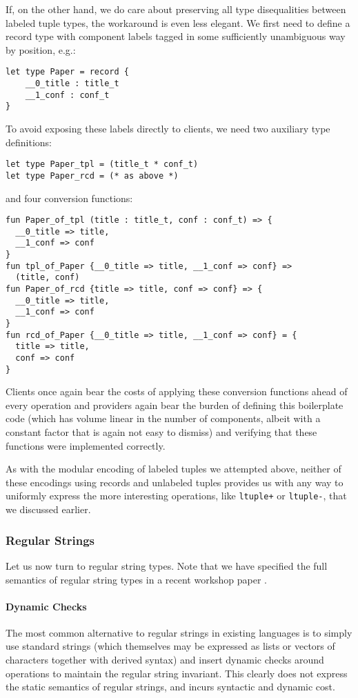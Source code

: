If, on the other hand, we do care about preserving all type disequalities between labeled tuple types, the workaround is even less elegant. We first need to define a record type with component labels tagged in some sufficiently unambiguous way by position, e.g.:
\begin{lstlisting}[numbers=none]
let type Paper = record {
	__0_title : title_t
	__1_conf : conf_t 
}\end{lstlisting}
To avoid exposing these labels directly to clients, we need two auxiliary type definitions:
\begin{lstlisting}[numbers=none]
let type Paper_tpl = (title_t * conf_t)
let type Paper_rcd = (* as above *)
\end{lstlisting}
and four conversion functions:
\begin{lstlisting}[numbers=none]
fun Paper_of_tpl (title : title_t, conf : conf_t) => {
  __0_title => title,
  __1_conf => conf
}
fun tpl_of_Paper {__0_title => title, __1_conf => conf} => 
  (title, conf)
fun Paper_of_rcd {title => title, conf => conf} => {
  __0_title => title,
  __1_conf => conf
}
fun rcd_of_Paper {__0_title => title, __1_conf => conf} = {
  title => title,
  conf => conf
}
\end{lstlisting}
Clients once again bear the costs of applying these conversion functions ahead of every operation and providers again bear the burden of defining this boilerplate code (which has volume linear in the number of components, albeit with a constant factor that is again not easy to dismiss) and verifying that these functions were implemented correctly. %

As with the modular encoding of labeled tuples we attempted above, neither of these encodings using records and unlabeled tuples provides us with any way to uniformly express the more interesting operations, like \lstinline{ltuple+} or \lstinline{ltuple-}, that we discussed earlier.

\subsubsection{Regular Strings}
Let us now turn to regular string types. Note that we have specified the full semantics of regular string types in a recent workshop paper \cite{sanitation-psp14}.

\paragraph{Dynamic Checks}
The most common alternative to regular strings in existing languages is to simply use standard strings (which themselves may be expressed as lists or vectors of characters together with derived syntax) and insert dynamic checks around operations to maintain the regular string invariant. This clearly does not express the static semantics of regular strings, and incurs syntactic and dynamic cost.

